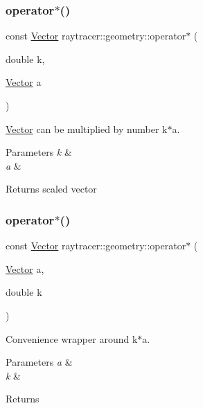 \subsubsection{\texorpdfstring{operator$\ast$()}{operator*()}\hspace{0.1cm}{\footnotesize\ttfamily [1/3]}}
{\footnotesize\ttfamily const \hyperlink{classraytracer_1_1geometry_1_1Vector}{Vector} raytracer\+::geometry\+::operator$\ast$ (\begin{DoxyParamCaption}\item[{double}]{k,  }\item[{\hyperlink{classraytracer_1_1geometry_1_1Vector}{Vector}}]{a }\end{DoxyParamCaption})}



\hyperlink{classraytracer_1_1geometry_1_1Vector}{Vector} can be multiplied by number k$\ast$a. 


\begin{DoxyParams}{Parameters}
{\em k} & \\
\hline
{\em a} & \\
\hline
\end{DoxyParams}
\begin{DoxyReturn}{Returns}
scaled vector 
\end{DoxyReturn}
\mbox{\label{namespaceraytracer_1_1geometry_a3030b86be5d83356f089b60e3465ee12}} 
\subsubsection{\texorpdfstring{operator$\ast$()}{operator*()}\hspace{0.1cm}{\footnotesize\ttfamily [2/3]}}
{\footnotesize\ttfamily const \hyperlink{classraytracer_1_1geometry_1_1Vector}{Vector} raytracer\+::geometry\+::operator$\ast$ (\begin{DoxyParamCaption}\item[{\hyperlink{classraytracer_1_1geometry_1_1Vector}{Vector}}]{a,  }\item[{double}]{k }\end{DoxyParamCaption})}



Convenience wrapper around k$\ast$a. 


\begin{DoxyParams}{Parameters}
{\em a} & \\
\hline
{\em k} & \\
\hline
\end{DoxyParams}
\begin{DoxyReturn}{Returns}

\end{DoxyReturn}
\mbox{\label{namespaceraytracer_1_1geometry_a11b9e4ba4dc8bcc091387d4a7934ab7e}} 
